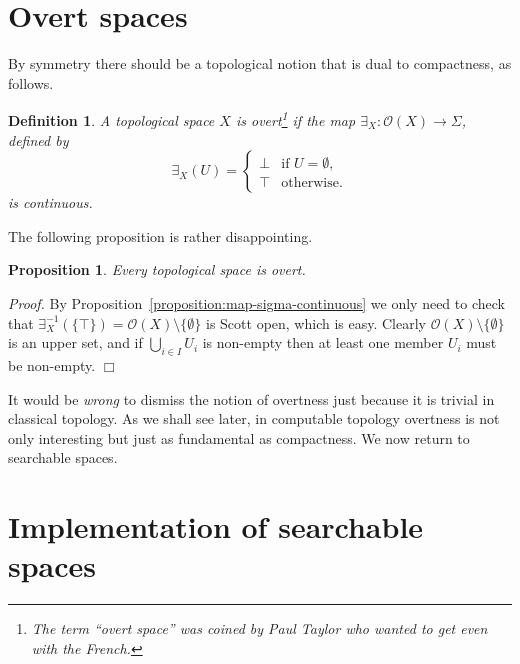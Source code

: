\documentclass[a4paper,11pt]{article}
\newtheorem{proposition}[theorem]{Proposition}
\newtheorem{definition}[theorem]{Definition}
\newenvironment{proof}{\par\noindent\textit{Proof.}}{\hfill$\Box$\par\medskip}
\newcommand{\set}[1]{\{#1\}}
\newcommand{\tpl}[1]{\mathcal{O}(#1)}
\begin{document}
\section{Overt spaces}
\label{sec:overt-spaces}

By symmetry there should be a topological notion that is dual to
compactness, as follows.

\begin{definition}
  A topological space $X$ is \emph{overt}\footnote{The term ``overt
    space'' was coined by Paul Taylor who wanted to get even with the
    French.} if the map $\exists_X : \tpl{X} \to \Sigma$, defined by
  \begin{equation*}
    \exists_X (U) =
    \begin{cases}
      \bot & \text{if $U = \emptyset$,}\\
      \top & \text{otherwise.}
    \end{cases}
  \end{equation*}
  is continuous.
\end{definition}

The following proposition is rather disappointing.

\begin{proposition}
  Every topological space is overt.
\end{proposition}

\begin{proof}
  By Proposition~\ref{proposition:map-sigma-continuous} we only need
  to check that $\exists_X^{-1}(\set{\top}) = \tpl{X} \setminus
  \set{\emptyset}$ is Scott open, which is easy. Clearly $\tpl{X} \setminus
  \set{\emptyset}$ is an upper set, and if $\bigcup_{i \in I} U_i$ is
  non-empty then at least one member $U_i$ must be non-empty.
\end{proof}

It would be \emph{wrong} to dismiss the notion of overtness just
because it is trivial in classical topology. As we shall see later,
in computable topology overtness is not only interesting but just as
fundamental as compactness. We now return to searchable spaces.


\section{Implementation of searchable spaces}
\label{sec:implementation-searchable}
\end{document}
